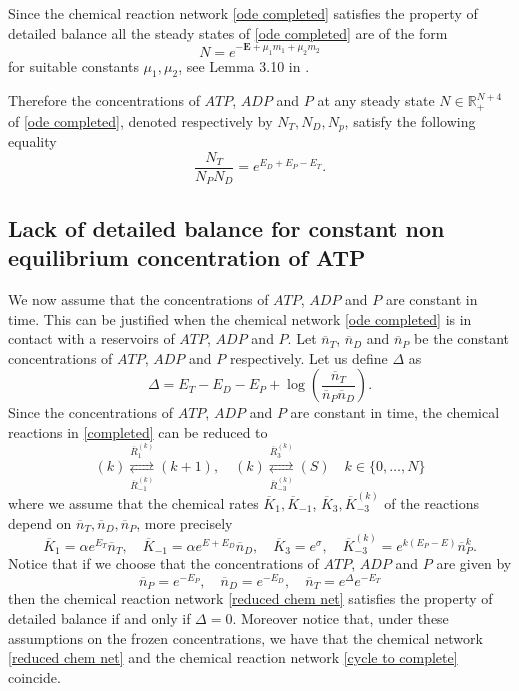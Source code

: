 \documentclass{article}
\numberwithin{equation}{section}
\theoremstyle{plain}
\begin{document}
Since the chemical reaction network \eqref{ode completed} satisfies the property of detailed balance all the steady states of \eqref{ode completed} are of the form 
\[
N = e^{- \textbf{E} + \mu_1 m_1  + \mu_2 m_2  }
\]
for suitable constants $\mu_1, \mu_2 $, see Lemma 3.10 in \cite{franco2025detailed}. 

Therefore the concentrations of $ATP$, $ADP $ and $P$ at any steady state $N \in \mathbb R_+^{N +4 } $ of \eqref{ode completed}, denoted respectively by $N_{T}, N_D, N_p $, satisfy the following equality 
\[
\frac{N_T }{N_P N_D } = e^{  E_D + E_P -E_T  }. 
\]

\subsection{Lack of detailed balance for constant non equilibrium concentration of ATP}
We now assume that the concentrations of $ATP$, $ADP $ and $P$ are constant in time. This can be justified when the chemical network \eqref{ode completed} is in contact with a reservoirs of $ATP$, $ADP $ and $P$.
Let $\overline n_T $, $\overline n_D $ and $ \overline n_P$ be the constant concentrations of $ATP$, $ADP $ and $P$ respectively. 
Let us define $\Delta $ as
 \[
\Delta = E_T - E_D - E_P + \log \left( \frac{\overline n_T }{ \overline n_P \overline n_D }  \right). 
 \] 
Since the concentrations of $ATP$, $ADP $ and $P$ are constant in time, the chemical reactions in \eqref{completed}  can be reduced to 
\begin{equation} \label{reduced chem net}
(k) \overset{\overline R_1^{(k)} }{\underset{\overline R_{-1}^{(k)} } \rightleftarrows}(k+1),  \quad  (k) \overset{ \overline R_3^{(k)} }{\underset{\overline R_{-3}^{(k)} } \rightleftarrows}  (S)  \quad k \in \{ 0, \dots, N\}
\end{equation}
where  we assume that the chemical rates $\overline{K}_1, \overline{K}_{-1}$, $\overline{K}_3 , \overline{K}_{-3}^{(k)}$ of the reactions depend on $\overline n_T,\overline n_D,\overline n_P$, more precisely 
\[
\overline{K}_1 = \alpha  e^{E_T}\overline n_T , \quad \overline K_{-1}= \alpha e^{E+ E_D }\overline n_D, \quad 
\overline K_3=  e^\sigma , \quad \overline K_{-3}^{(k)} = e^{k (E_P- E) } \overline n_P^k. 
\]
Notice that if we choose that the concentrations of $ATP$, $ADP $ and $P$ are given by 
\[ 
\overline n_P = e^{- E_P} , \quad  \overline n_D=e^{- E_D}, \quad \overline n_T = e^\Delta e^{- E_T} 
\] 
then the chemical reaction network  \eqref{reduced chem net} satisfies the property of detailed balance if and only if $\Delta = 0$. Moreover notice that, under these assumptions on the frozen concentrations, we have that  the chemical network  \eqref{reduced chem net} and the chemical reaction network \eqref{cycle to complete} coincide. 
\end{document}
